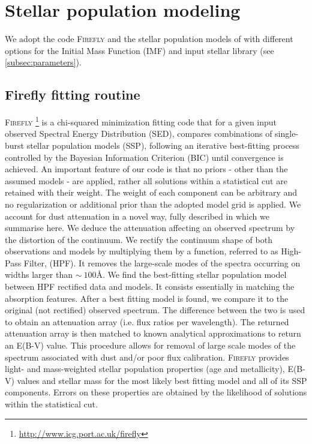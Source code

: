 \documentclass[onecolumn]{aa}
\begin{document}
\section{Stellar population modeling}
\label{sec:SPS}

We adopt the code \textsc{Firefly} \citep{firefly2017MNRAS} and the stellar population models of \citet{Maraston_2011} with different options for the Initial Mass Function (IMF) and input stellar library (see \ref{subsec:parameters}).

\subsection{Firefly fitting routine}
\textsc{Firefly}
\footnote{\url{http://www.icg.port.ac.uk/firefly}} 
is a chi-squared minimization fitting code that for a given input observed Spectral Energy Distribution (SED), 
compares combinations of single-burst stellar population models (SSP), 
following an iterative best-fitting process controlled by the Bayesian 
Information Criterion (BIC) until convergence is achieved. 
An important feature of our code is that no priors - other than the assumed models - are applied, rather all solutions within a statistical cut are retained with their weight.
The weight of each component can be arbitrary and no regularization or additional prior than the adopted model grid is applied. 
We account for dust attenuation in a novel way, fully described in \citet{firefly2017MNRAS} which we summarise here. 
We deduce the attenuation affecting an observed spectrum by the distortion of the continuum. 
We rectify the continuum shape %
of both observations and models by multiplying them by a function, referred to as High-Pass Filter, (HPF). 
It removes the large-scale modes of the spectra occurring on widths larger than $\sim~100$\AA. 
We find the best-fitting stellar population model between HPF rectified data and models. 
It consists essentially in matching the absorption features. 
After a best fitting model is found, we compare it to the original (not rectified) observed spectrum. The difference between the two is used to obtain an attenuation array (i.e. flux ratios per wavelength). 
The returned attenuation array is then matched to known analytical approximations to return an E(B-V) value. 
This procedure allows for removal of large scale modes of the spectrum associated with dust and/or poor flux calibration.	
\textsc{Firefly} provides light- and mass-weighted stellar population properties (age and metallicity), E(B-V) values and stellar mass for the most likely best fitting model and all of its SSP components.  
Errors on these properties are obtained by the likelihood of solutions within the statistical cut. 
\end{document}
